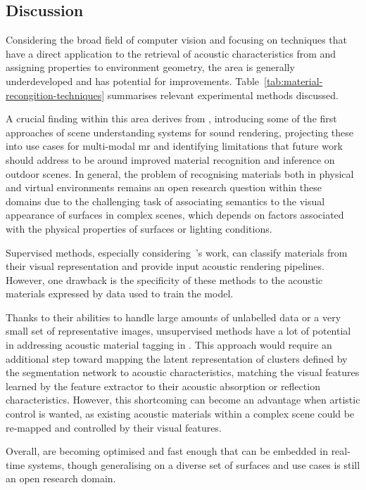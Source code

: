 \subsection{Discussion}
Considering the broad field of computer vision and focusing on techniques that have a direct application to the retrieval of acoustic characteristics from  and assigning properties to environment geometry, the area is generally underdeveloped and has potential for improvements. Table~\ref{tab:material-recongition-techniques} summarises relevant experimental methods discussed.\par
A crucial finding within this area derives from \cite{schissler2017acoustic}, introducing some of the first approaches of scene understanding systems for sound rendering, projecting these into use cases for multi-modal \acrshort{mr} and identifying limitations that future work should address to be around improved material recognition and inference on outdoor scenes. In general, the problem of recognising materials both in physical and virtual environments remains an open research question within these domains due to the challenging task of associating semantics to the visual appearance of surfaces in complex scenes, which depends on factors associated with the physical properties of surfaces or lighting conditions.\par 
Supervised methods, especially considering~\cite{kim2019immersive}'s work, can classify materials from their visual representation and provide input acoustic rendering pipelines. However, one drawback is the specificity of these methods to the acoustic materials expressed by data used to train the model.\par
Thanks to their abilities to handle large amounts of unlabelled data or a very small set of representative images, unsupervised methods have a lot of potential in addressing acoustic material tagging in . This approach would require an additional step toward mapping the latent representation of clusters defined by the segmentation network to acoustic characteristics, matching the visual features learned by the feature extractor to their acoustic absorption or reflection characteristics. However, this shortcoming can become an advantage when artistic control is wanted, as existing acoustic materials within a complex scene could be re-mapped and controlled by their visual features.\par
Overall,  are becoming optimised and fast enough that can be embedded in real-time systems, though generalising on a diverse set of surfaces and use cases is still an open research domain.


